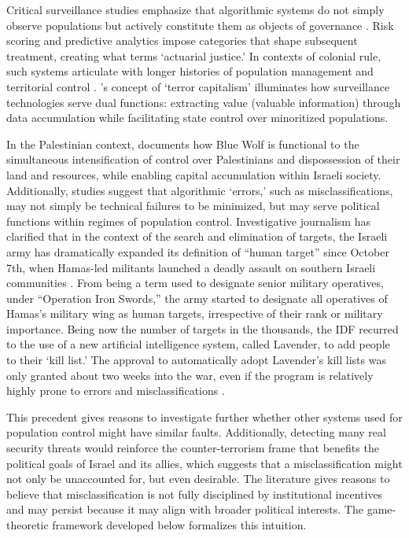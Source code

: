 \documentclass[11pt,a4paper]{article}
\theoremstyle{definition}
\theoremstyle{remark}
\theoremstyle{definition}
\begin{document}
Critical surveillance studies emphasize that algorithmic systems do not simply observe populations but actively constitute them as objects of 
governance \citep{browne2015dark, benjamin2019race}. Risk scoring and predictive analytics impose categories that shape subsequent treatment, 
creating what \citet{harcourt2007against} terms `actuarial justice.' In contexts of colonial rule, such systems articulate with longer histories 
of population management and territorial control \citep{zureik2011colonialism, shalhoub2015security}. \citet{byler2022terror}'s concept of 
`terror capitalism' illuminates how surveillance technologies serve dual functions: extracting value (valuable information) through data 
accumulation while facilitating state control over minoritized populations. 

In the Palestinian context, \citet{goodfriend2023algorithmic} 
documents how Blue Wolf is functional to the simultaneous intensification of control over Palestinians and dispossession of their land and 
resources, while enabling capital accumulation within Israeli society. Additionally, studies suggest that algorithmic 
`errors,' such as misclassifications, may not simply be technical failures to be minimized, but may serve political functions within regimes of population 
control. Investigative journalism has clarified that in the context of the search and elimination of targets, the 
Israeli army has dramatically expanded its definition of ``human target'' since October 7th, when Hamas-led militants launched a deadly assault 
on southern Israeli communities \citep{abraham2024lavender}. From being a term used to designate senior military operatives, under ``Operation 
Iron Swords,'' the army started to designate all operatives of Hamas's military wing as human targets, irrespective of their rank or military 
importance. Being now the number of targets in the thousands, the IDF recurred to the use of a new artificial intelligence system, called 
Lavender, to add people to their `kill list.' The approval to automatically adopt Lavender's kill lists was only granted about two weeks into 
the war, even if the program is relatively highly prone to errors and misclassifications \citep{abraham2024lavender}. 

This precedent gives reasons to 
investigate further whether other systems used for population control might have similar faults. Additionally, detecting many real security 
threats would reinforce the counter-terrorism frame that benefits the political goals of Israel and its allies, which suggests that a 
misclassification might not only be unaccounted for, but even desirable. The literature gives reasons to believe that misclassification is not 
fully disciplined by institutional incentives and may persist because it may align with broader political interests. The game-theoretic 
framework developed below formalizes this intuition.
\end{document}
